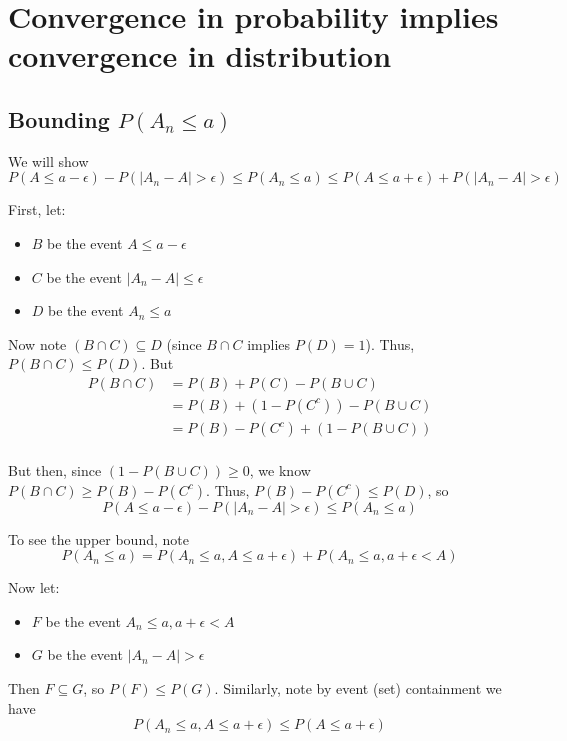 \documentclass[paper=a4, fontsize=11pt]{scrartcl} %
\numberwithin{equation}{section} %
\numberwithin{figure}{section} %
\numberwithin{table}{section} %
\begin{document}

\section{Convergence in probability implies convergence in distribution}

\subsection{Bounding $P(A_n \leq a)$}

We will show
\[P(A\leq a - \epsilon) - P(|A_n - A| > \epsilon) \leq P(A_n \leq a) \leq P(A \leq a + \epsilon) + P(|A_n - A| > \epsilon)\]

First, let:
\begin{itemize}
\item $B$ be the event $A \leq a - \epsilon$
\item $C$ be the event $|A_n - A| \leq \epsilon$
\item $D$ be the event $A_n \leq a$
\end{itemize}

Now note $(B \cap C) \subseteq D$ (since $B \cap C$ implies $P(D) = 1$). Thus, $P(B \cap C) \leq P(D)$. But
\begin{align*}
P(B \cap C) &= P(B) + P(C) - P(B \cup C) \\
   &= P(B) + (1 - P(C^c)) - P(B \cup C)\\
   &= P(B) - P(C^c) + (1 - P(B \cup C)) \\
\end{align*}

But then, since $(1 - P(B \cup C)) \geq 0$, we know $P(B \cap C) \geq P(B) - P(C^c)$. Thus, $P(B) - P(C^c) \leq P(D)$, so
\[P(A\leq a - \epsilon) - P(|A_n - A| > \epsilon) \leq P(A_n \leq a)\]

To see the upper bound, note
\[P(A_n \leq a) = P(A_n \leq a, A \leq a + \epsilon) + P(A_n \leq a, a + \epsilon < A)\]

Now let: 
\begin{itemize}
\item $F$ be the event $A_n \leq a, a + \epsilon < A$
\item $G$ be the event $|A_n - A| > \epsilon$
\end{itemize}

Then $F \subseteq G$, so $P(F) \leq P(G)$. Similarly, note by event (set) containment we have
\[P(A_n \leq a, A \leq a + \epsilon) \leq P(A \leq a + \epsilon)\]
\end{document}
